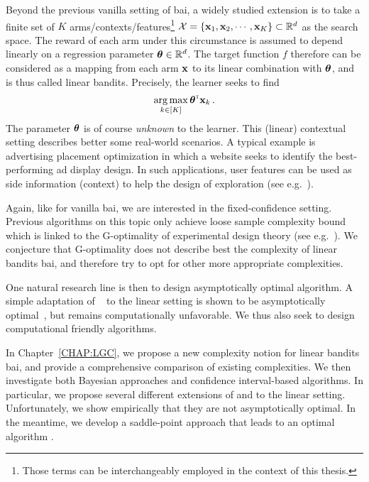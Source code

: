 Beyond the previous vanilla setting of \gls{bai}, a widely studied extension is to take a finite set of $K$ arms/contexts/features\footnote{Those terms can be interchangeably employed in the context of this thesis.} $\mathcal{X}=\{{\bf x}_1,{\bf x}_2,\cdots,{\bf x}_K\}\subset\mathbb{R}^d$ as the search space. The reward of each arm under this circumstance is assumed to depend linearly on a \gls{regression parameter} ${\boldsymbol \theta}\in\mathbb{R}^d$. The target function $f$ therefore can be considered as a mapping from each arm ${\bf x}$ to its linear combination with ${\boldsymbol \theta}$, and is thus called linear bandits. Precisely, the learner seeks to find
\begin{align}\label{eq:optim_linbai}
    \operatorname*{arg\,max}_{k\in[K]} {\boldsymbol \theta}^{\mathsf{\scriptscriptstyle T}}{\bf x}_k\,.
\end{align}
The parameter ${\boldsymbol \theta}$ is of course \emph{unknown} to the learner. This (linear) contextual setting describes better some real-world scenarios. A typical example is advertising placement optimization in which a website seeks to identify the best-performing ad display design. In such applications, user features can be used as side information (context) to help the design of exploration (see e.g.~\citealt{li2010contextual}).

Again, like for vanilla \gls{bai}, we are interested in the fixed-confidence setting. Previous algorithms on this topic only achieve loose sample complexity bound which is linked to the \gls{G-optimality} of experimental design theory (see e.g.~\citealt{pukelsheim2006optimal}). We conjecture that G-optimality does not describe best the complexity of linear bandits \gls{bai}, and therefore try to opt for other more appropriate complexities.

One natural research line is then to design asymptotically optimal algorithm. A simple adaptation of \Track~\citep{garivier2016tracknstop} to the linear setting is shown to be asymptotically optimal~\citep{jedra2020linear}, but remains computationally unfavorable. We thus also seek to design computational friendly algorithms. 

In Chapter~\ref{CHAP:LGC}, we propose a new complexity notion for linear bandits \gls{bai}, and provide a comprehensive comparison of existing complexities. We then investigate both Bayesian approaches and confidence interval-based algorithms. In particular, we propose several different extensions of \TTTS{} and \TCC{} to the linear setting. Unfortunately, we show empirically that they are not asymptotically optimal. In the meantime, we develop a saddle-point approach that leads to an optimal algorithm \LG{}.

